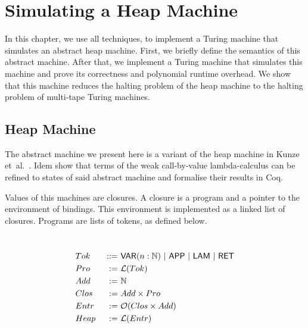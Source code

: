 \chapter{Simulating a Heap Machine}
\label{chap:heap}

In this chapter, we use all techniques, to implement a Turing machine that simulates an abstract heap machine.  First, we briefly define the semantics
of this abstract machine.  After that, we implement a Turing machine that simulates this machine and prove its correctness and polynomial runtime
overhead.  We show that this machine reduces the halting problem of the heap machine to the halting problem of multi-tape Turing machines.

\section{Heap Machine}
\label{sec:heap-def}

The abstract machine we present here is a variant of the heap machine in Kunze et~al.~\cite{KunzeEtAl:2018:Formal}.  Idem show that terms of the weak
call-by-value lambda-calculus can be refined to states of said abstract machine and formalise their results in Coq.

Values of this machines are closures.  A closure is a program and a pointer to the environment of bindings.  This environment is implemented as a
linked list of closures.  Programs are lists of tokens, as defined below.
\begin{definition}
  \label{def:Heap}
  ~
  \begin{alignat*}{2}
    &Tok  &~::=~& \mathsf{VAR}(n:\mathbb{N}) ~|~ \mathsf{APP} ~|~ \mathsf{LAM} ~|~ \mathsf{RET} \\
    &Pro  &~:=~& \mathcal{L}(Tok) \\
    &Add  &~:=~& \mathbb{N} \\
    &Clos &~:=~& Add \times Pro \\
    &Entr &~:=~& \mathcal{O}(Clos \times Add) \\
    &Heap &~:=~& \mathcal{L}(Entr)
  \end{alignat*}
\end{definition}

